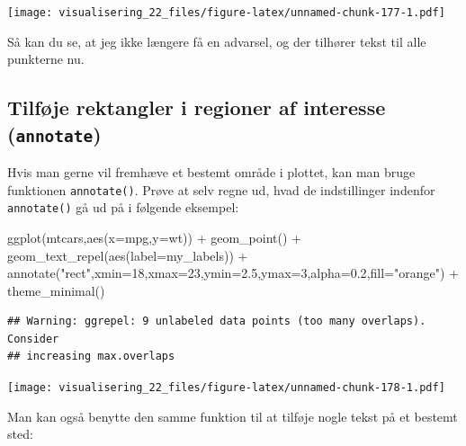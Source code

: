 \documentclass[
]{book}
\newenvironment{Shaded}{\begin{snugshade}}{\end{snugshade}}
\newcommand{\AttributeTok}[1]{\textcolor[rgb]{0.77,0.63,0.00}{#1}}
\newcommand{\DecValTok}[1]{\textcolor[rgb]{0.00,0.00,0.81}{#1}}
\newcommand{\FloatTok}[1]{\textcolor[rgb]{0.00,0.00,0.81}{#1}}
\newcommand{\FunctionTok}[1]{\textcolor[rgb]{0.00,0.00,0.00}{#1}}
\newcommand{\NormalTok}[1]{#1}
\newcommand{\SpecialCharTok}[1]{\textcolor[rgb]{0.00,0.00,0.00}{#1}}
\newcommand{\StringTok}[1]{\textcolor[rgb]{0.31,0.60,0.02}{#1}}
\begin{document}
\texttt{[image: visualisering\_22\_files/figure-latex/unnamed-chunk-177-1.pdf]}

Så kan du se, at jeg ikke længere få en advarsel, og der tilhører tekst til alle punkterne nu.

\hypertarget{tilfuxf8je-rektangler-i-regioner-af-interesse-annotate}{%
\subsection{\texorpdfstring{Tilføje rektangler i regioner af interesse (\texttt{annotate})}{Tilføje rektangler i regioner af interesse (annotate)}}\label{tilfuxf8je-rektangler-i-regioner-af-interesse-annotate}}

Hvis man gerne vil fremhæve et bestemt område i plottet, kan man bruge funktionen \texttt{annotate()}. Prøve at selv regne ud, hvad de indstillinger indenfor \texttt{annotate()} gå ud på i følgende eksempel:

\begin{Shaded}
\begin{Highlighting}[]
\FunctionTok{ggplot}\NormalTok{(mtcars,}\FunctionTok{aes}\NormalTok{(}\AttributeTok{x=}\NormalTok{mpg,}\AttributeTok{y=}\NormalTok{wt)) }\SpecialCharTok{+} 
  \FunctionTok{geom\_point}\NormalTok{() }\SpecialCharTok{+}
  \FunctionTok{geom\_text\_repel}\NormalTok{(}\FunctionTok{aes}\NormalTok{(}\AttributeTok{label=}\NormalTok{my\_labels)) }\SpecialCharTok{+}
  \FunctionTok{annotate}\NormalTok{(}\StringTok{"rect"}\NormalTok{,}\AttributeTok{xmin=}\DecValTok{18}\NormalTok{,}\AttributeTok{xmax=}\DecValTok{23}\NormalTok{,}\AttributeTok{ymin=}\FloatTok{2.5}\NormalTok{,}\AttributeTok{ymax=}\DecValTok{3}\NormalTok{,}\AttributeTok{alpha=}\FloatTok{0.2}\NormalTok{,}\AttributeTok{fill=}\StringTok{"orange"}\NormalTok{) }\SpecialCharTok{+}
  \FunctionTok{theme\_minimal}\NormalTok{()}
\end{Highlighting}
\end{Shaded}

\begin{verbatim}
## Warning: ggrepel: 9 unlabeled data points (too many overlaps). Consider
## increasing max.overlaps
\end{verbatim}

\texttt{[image: visualisering\_22\_files/figure-latex/unnamed-chunk-178-1.pdf]}

Man kan også benytte den samme funktion til at tilføje nogle tekst på et bestemt sted:
\end{document}
